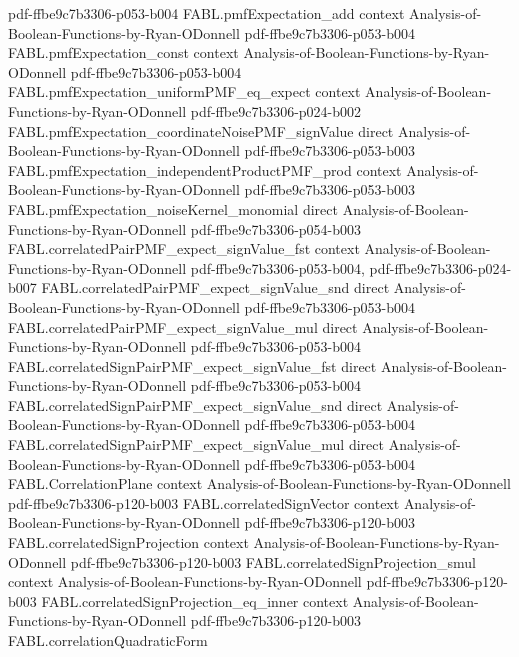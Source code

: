\begin{theorem}
  {pdf-ffbe9c7b3306-p053-b004}
\proofstep
  {FABL.pmfExpectation_add}
  {context}
  {Analysis-of-Boolean-Functions-by-Ryan-ODonnell}
  {pdf-ffbe9c7b3306-p053-b004}
\proofstep
  {FABL.pmfExpectation_const}
  {context}
  {Analysis-of-Boolean-Functions-by-Ryan-ODonnell}
  {pdf-ffbe9c7b3306-p053-b004}
\proofstep
  {FABL.pmfExpectation_uniformPMF_eq_expect}
  {context}
  {Analysis-of-Boolean-Functions-by-Ryan-ODonnell}
  {pdf-ffbe9c7b3306-p024-b002}
\proofstep
  {FABL.pmfExpectation_coordinateNoisePMF_signValue}
  {direct}
  {Analysis-of-Boolean-Functions-by-Ryan-ODonnell}
  {pdf-ffbe9c7b3306-p053-b003}
\proofstep
  {FABL.pmfExpectation_independentProductPMF_prod}
  {context}
  {Analysis-of-Boolean-Functions-by-Ryan-ODonnell}
  {pdf-ffbe9c7b3306-p053-b003}
\proofstep
  {FABL.pmfExpectation_noiseKernel_monomial}
  {direct}
  {Analysis-of-Boolean-Functions-by-Ryan-ODonnell}
  {pdf-ffbe9c7b3306-p054-b003}
\proofstep
  {FABL.correlatedPairPMF_expect_signValue_fst}
  {context}
  {Analysis-of-Boolean-Functions-by-Ryan-ODonnell}
  {pdf-ffbe9c7b3306-p053-b004,
    pdf-ffbe9c7b3306-p024-b007}
\proofstep
  {FABL.correlatedPairPMF_expect_signValue_snd}
  {direct}
  {Analysis-of-Boolean-Functions-by-Ryan-ODonnell}
  {pdf-ffbe9c7b3306-p053-b004}
\proofstep
  {FABL.correlatedPairPMF_expect_signValue_mul}
  {direct}
  {Analysis-of-Boolean-Functions-by-Ryan-ODonnell}
  {pdf-ffbe9c7b3306-p053-b004}
\proofstep
  {FABL.correlatedSignPairPMF_expect_signValue_fst}
  {direct}
  {Analysis-of-Boolean-Functions-by-Ryan-ODonnell}
  {pdf-ffbe9c7b3306-p053-b004}
\proofstep
  {FABL.correlatedSignPairPMF_expect_signValue_snd}
  {direct}
  {Analysis-of-Boolean-Functions-by-Ryan-ODonnell}
  {pdf-ffbe9c7b3306-p053-b004}
\proofstep
  {FABL.correlatedSignPairPMF_expect_signValue_mul}
  {direct}
  {Analysis-of-Boolean-Functions-by-Ryan-ODonnell}
  {pdf-ffbe9c7b3306-p053-b004}
\proofstep
  {FABL.CorrelationPlane}
  {context}
  {Analysis-of-Boolean-Functions-by-Ryan-ODonnell}
  {pdf-ffbe9c7b3306-p120-b003}
\proofstep
  {FABL.correlatedSignVector}
  {context}
  {Analysis-of-Boolean-Functions-by-Ryan-ODonnell}
  {pdf-ffbe9c7b3306-p120-b003}
\proofstep
  {FABL.correlatedSignProjection}
  {context}
  {Analysis-of-Boolean-Functions-by-Ryan-ODonnell}
  {pdf-ffbe9c7b3306-p120-b003}
\proofstep
  {FABL.correlatedSignProjection_smul}
  {context}
  {Analysis-of-Boolean-Functions-by-Ryan-ODonnell}
  {pdf-ffbe9c7b3306-p120-b003}
\proofstep
  {FABL.correlatedSignProjection_eq_inner}
  {context}
  {Analysis-of-Boolean-Functions-by-Ryan-ODonnell}
  {pdf-ffbe9c7b3306-p120-b003}
\proofstep
  {FABL.correlationQuadraticForm}

\end{theorem}
